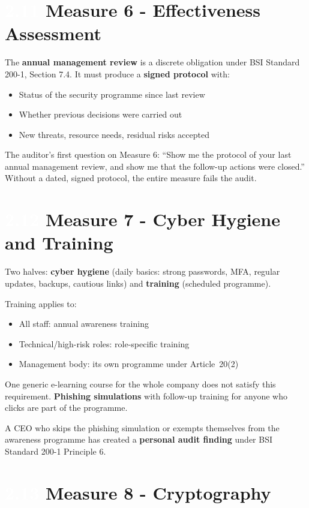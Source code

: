 \documentclass[11pt,a4paper,twoside]{book}
\newcommand{\lessontag}[1]{%
  \texorpdfstring{%
    \setlength{\fboxsep}{3pt}\colorbox{nisd2blue}{\textcolor{white}{\footnotesize\bfseries #1}}\quad%
  }{Lesson #1\ }%
}
\begin{document}
\section{\lessontag{2.11}Measure 6 - Effectiveness Assessment}

The \textbf{annual management review} is a discrete obligation under BSI Standard 200-1, Section 7.4. It must produce a \textbf{signed protocol} with:
\begin{itemize}
  \item Status of the security programme since last review
  \item Whether previous decisions were carried out
  \item New threats, resource needs, residual risks accepted
\end{itemize}

The auditor's first question on Measure 6: ``Show me the protocol of your last annual management review, and show me that the follow-up actions were closed.'' Without a dated, signed protocol, the entire measure fails the audit.

\section{\lessontag{2.12}Measure 7 - Cyber Hygiene and Training}

Two halves: \textbf{cyber hygiene} (daily basics: strong passwords, MFA, regular updates, backups, cautious links) and \textbf{training} (scheduled programme).

Training applies to:
\begin{itemize}
  \item All staff: annual awareness training
  \item Technical/high-risk roles: role-specific training
  \item Management body: its own programme under Article~20(2)
\end{itemize}

One generic e-learning course for the whole company does not satisfy this requirement. \textbf{Phishing simulations} with follow-up training for anyone who clicks are part of the programme.

A CEO who skips the phishing simulation or exempts themselves from the awareness programme has created a \textbf{personal audit finding} under BSI Standard 200-1 Principle 6.

\section{\lessontag{2.13}Measure 8 - Cryptography}
\end{document}
